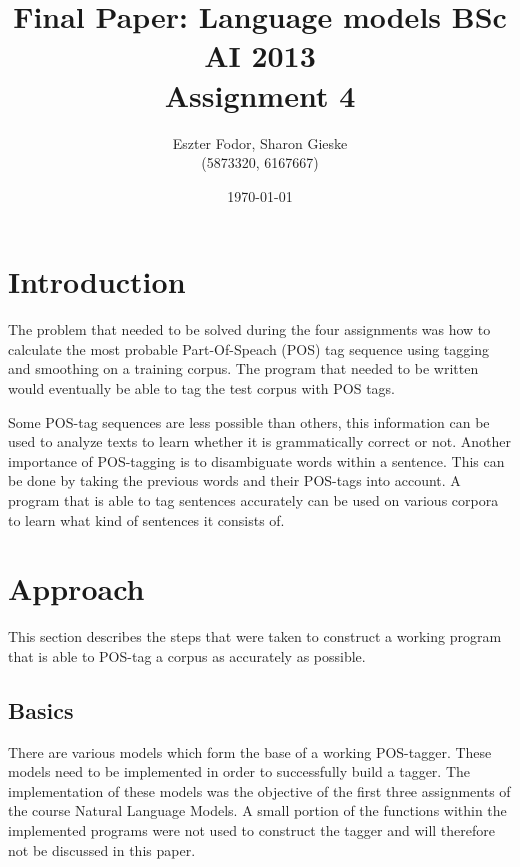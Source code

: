 \documentclass[10pt, a4paper]{article}
\title{Final Paper: Language models BSc AI 2013 \\ Assignment 4}
\author{Eszter Fodor, Sharon Gieske \\ (5873320, 6167667)}
\date{\today}
\begin{document}
\maketitle{}


\section*{Introduction}
The problem that needed to be solved during the four assignments was how to calculate the most
probable Part-Of-Speach (POS) tag sequence using tagging and smoothing on a training corpus. The
program that needed to be written would eventually be able to tag the test corpus with POS tags.

Some POS-tag sequences are less possible than others, this information can be used to analyze 
texts to learn whether it is grammatically correct or not.
Another importance of POS-tagging is to disambiguate words within a sentence. This can be done by
taking the previous words and their POS-tags into account. A program that is able to tag sentences
accurately can be used on various corpora to learn what kind of sentences it consists of. 

\section*{Approach}
This section describes the steps that were taken to construct a working program that is able to POS-tag a corpus as accurately as possible.


\subsection*{Basics}
There are various models which form the base of a working POS-tagger. These models need to be implemented in order to successfully build a tagger. The implementation of these models was the objective of the first three assignments of the course Natural Language Models. A small portion of the functions within the implemented programs were not used to construct the tagger and will therefore not be discussed in this paper.
\end{document}
